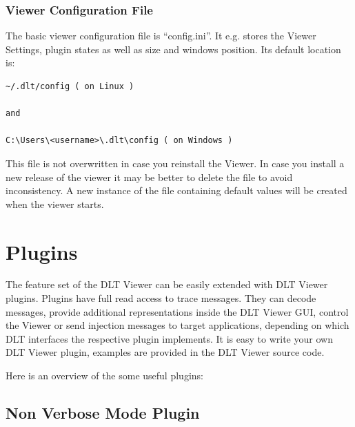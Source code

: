 \documentclass[a4paper,11pt]{article}
\begin{document}

\subsubsection{Viewer Configuration File}

The basic viewer configuration file is ``config.ini''. It e.g. stores the Viewer Settings, plugin states as well as size and windows position.
Its default location is:

\begin{verbatim}
~/.dlt/config ( on Linux )

and

C:\Users\<username>\.dlt\config ( on Windows )
\end{verbatim}



This file is not overwritten in case you reinstall the Viewer.
In case you install a new release of the viewer it may be better
to delete the file to avoid inconsistency.
A new instance of the file containing default values will be created when the viewer starts.


\pagebreak

\section{Plugins}
\label{plugins}

The feature set of the DLT Viewer can be easily extended with DLT Viewer plugins.
Plugins have full read access to trace messages. They can decode messages,
provide additional representations inside the DLT Viewer GUI, control the Viewer or send injection messages
to target applications, depending on which DLT interfaces the respective plugin implements.
It is easy to write your own DLT Viewer plugin, examples are provided in the DLT Viewer source code.

Here is an overview of the some useful plugins:

\subsection{Non Verbose Mode Plugin}
\end{document}
